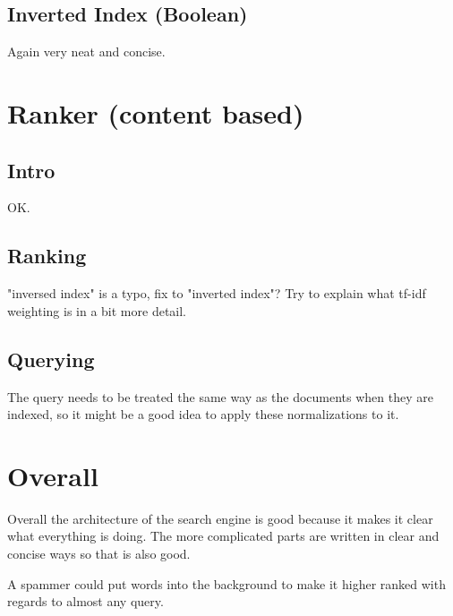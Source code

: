     \subsection{Inverted Index (Boolean)}
    Again very neat and concise.
    
\section*{Ranker (content based)}
    \subsection{Intro}
    OK.
    
    \subsection{Ranking}
    "inversed index" is a typo, fix to "inverted index"?
    Try to explain what tf-idf weighting is in a bit more detail.
    
    \subsection{Querying}
    The query needs to be treated the same way as the documents when they are indexed, so it might be a good idea to apply these normalizations to it.
    
\section*{Overall}
Overall the architecture of the search engine is good because it makes it clear what everything is doing. The more complicated parts are written in clear and concise ways so that is also good.

A spammer could put words into the background to make it higher ranked with regards to almost any query.

